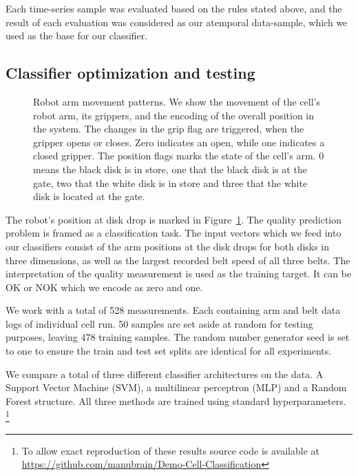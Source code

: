 \documentclass[5p,times,procedia]{elsarticle}
\begin{document}
Each time-series sample was evaluated based on the rules stated above, and the result of each evaluation was considered as our atemporal data-sample, which we used as the base for our classifier.

\subsection{Classifier optimization and testing}\label{sec:ml_exp}

\begin{figure}
       
       \caption{Robot arm movement patterns. We show the movement of the 
                cell's robot arm, its grippers, and the encoding of the overall
                position in the system. The changes in the grip flag are triggered,
                when the gripper opens or closes. Zero indicates an open, while
                one indicates a closed gripper. The position flags marks the state
                of the cell's arm. 0 means the black disk is in store,
                one that the black disk is at the gate, two that the white disk
                is in store and three that the white disk is located at the gate.
             }
\label{fig:robot_pos_cell}
\end{figure}

The robot's position at disk drop is marked in 
Figure~\ref{fig:robot_pos_cell}. The quality prediction problem is 
framed as a classification task. The input vectors which we feed into our
classifiers consist of the arm positions at the disk drops for both
disks in three dimensions, as well as the largest recorded belt speed
of all three belts. The interpretation of the quality measurement is 
used as the training target. It can be OK or NOK which we encode as 
zero and one.

We work with a total of 528 measurements. Each containing arm and belt data
logs of individual cell run. 50 samples are set aside at random for testing 
purposes, leaving 478 training samples. The random number generator seed is
set to one to ensure the train and test set splits are identical 
for all experiments.

We compare a total of three different classifier architectures on the data.
A Support Vector Machine (SVM), a multilinear perceptron (MLP) and a Random Forest
structure. All three methods are trained using standard hyperparameters.
\footnote{To allow exact reproduction of these results source
code is available at \url{https://github.com/manubrain/Demo-Cell-Classification}}
\end{document}
